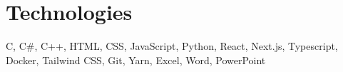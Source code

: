 \documentclass[../main.tex]{subfiles}
\begin{document}
    \section{Technologies}

        \begin{onecolentry}
            C, C\#, C++, HTML, CSS, JavaScript, Python, React, Next.js, Typescript, Docker, Tailwind CSS, Git, Yarn, Excel, Word, PowerPoint
        \end{onecolentry}
\end{document}
